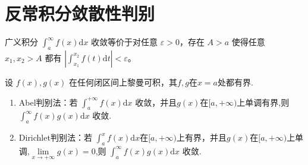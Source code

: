 \documentclass[../../main.tex]{subfiles}
\begin{document}
\section{反常积分敛散性判别}

\begin{theorem}[Cauchy收敛准则]
广义积分 \(\int_{a}^{\infty} f(x) \mathrm{d}x\) 收敛等价于对任意 \(\varepsilon > 0\)，存在 \(A > a\) 使得任意 \(x_1,x_2 > A\) 都有 \(\left|\int_{x_1}^{x_2} f(t) \mathrm{d}t\right| < \varepsilon\)。 
\end{theorem}

\begin{theorem}[A-D判别法]\label{theorem:A-D判别法}
设 \(f(x),g(x)\) 在任何闭区间上黎曼可积，其$f,g$在$x=a$处都有界.
\begin{enumerate}
\item {\heiti Abel判别法}：若 \(\int_{a}^{+\infty} f(x) \mathrm{d}x\) 收敛，并且$g(x)$在$[a,+\infty)$上单调有界,则 \(\int_{a}^{\infty} f(x)g(x) \mathrm{d}x\) 收敛.

\item {\heiti Dirichlet判别法}：若 \(\int_{a}^{x} f(x) \mathrm{d}x\)在$[a,+\infty)$上有界，并且\(g(x)\)在\([a,+\infty)\)上单调,$\underset{x\rightarrow +\infty}{\lim}g\left( x \right) =0$,则 \(\int_{a}^{\infty} f(x)g(x) \mathrm{d}x\) 收敛.
\end{enumerate}
\end{theorem}
\end{document}
